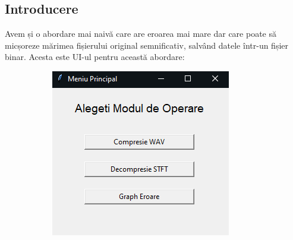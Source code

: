 \documentclass[12pt]{article}
\begin{document}
\subsection{Introducere}

Avem și o abordare mai naivă care are eroarea mai mare dar care poate să micșoreze mărimea fișierului original semnificativ, salvând datele într-un fișier binar.
Acesta este UI-ul pentru această abordare:

\begin{figure}[H]
	\centering
	\begin{subfigure}[b]{0.4\textwidth}
		\includegraphics[width=\linewidth]{ui1.png}
	\end{subfigure}
	\hfill
	\begin{subfigure}[b]{0.4\textwidth}

\end{subfigure}
\end{figure}
\end{document}
